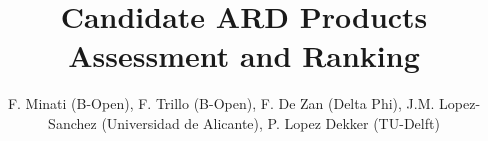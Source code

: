\documentclass[deltaphi]{deltaphi-report}
\title{Candidate ARD Products Assessment and Ranking}
\author{F. Minati (B-Open), F. Trillo (B-Open), F. De Zan (Delta Phi), J.M. Lopez-Sanchez (Universidad de Alicante), P. Lopez Dekker (TU-Delft)}
\newcommand{\EnableFootNotes}{%
  \LetLtxMacro\footnote\Oldfootnote%
}
\newcommand{\DisableFootNotes}{%
  \renewcommand{\footnote}[2][]{\relax}
}
\begin{document}
\maketitle
\makelog

\tableofcontents

%
\printacronyms
\clearpage

%
\clearpage
%
%
% 
% 
\end{document}
